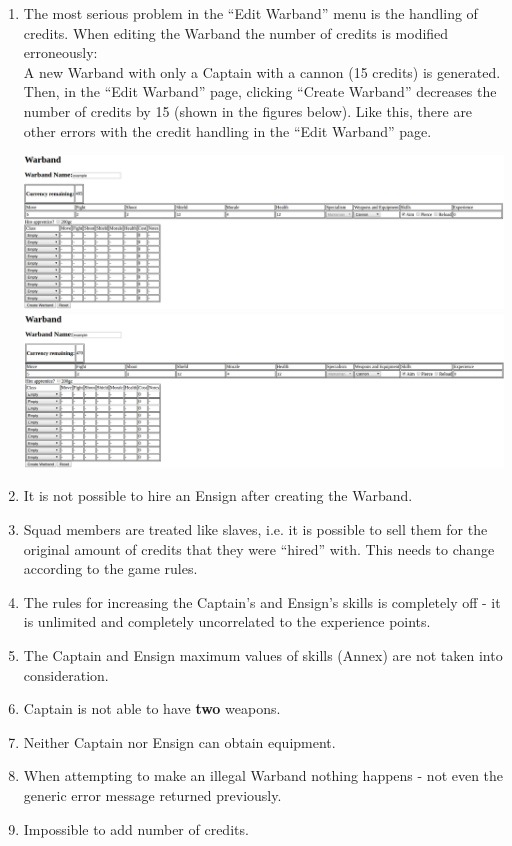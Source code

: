 \documentclass[12pt,a4paper]{article}
\begin{document}
\begin{enumerate}
 \item The most serious problem in the ``Edit Warband'' menu is the handling of credits. When editing the Warband the number of credits is modified erroneously:\\
 A new Warband with only a Captain with a cannon (15 credits) is generated. Then, in the ``Edit Warband'' page, clicking ``Create Warband'' decreases the number of credits by 15 (shown in the figures below). Like this, there are other errors with the credit handling in the ``Edit Warband'' page.\\
 \begin{minipage}[t]{\linewidth}
 \centering
 \includegraphics[width=1\textwidth]{img/example0}
 \includegraphics[width=1\textwidth]{img/example1}
 \end{minipage}
 
 \item It is not possible to hire an Ensign after creating the Warband.
 \item Squad members are treated like slaves, i.e. it is possible to sell them for the original amount of credits that they were ``hired'' with. This needs to change according to the game rules.
 \item The rules for increasing the Captain's and Ensign's skills is completely off - it is unlimited and completely uncorrelated to the experience points. 
 \item The Captain and Ensign maximum values of skills (Annex) are not taken into consideration.
 \item Captain is not able to have \textbf{two} weapons.
 \item Neither Captain nor Ensign can obtain equipment.
 \item When attempting to make an illegal Warband nothing happens - not even the generic error message returned previously.
 \item Impossible to add number of credits.
\end{enumerate}
\end{document}
